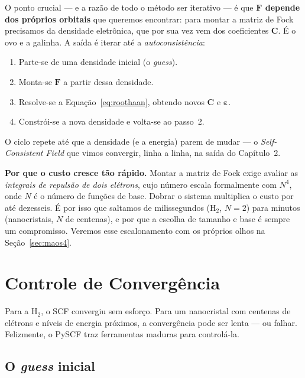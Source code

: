 \documentclass[11pt,a4paper,openany]{book}
\newcommand{\pyscf}{\textsf{PySCF}}
\begin{document}
O ponto crucial --- e a razão de todo o método ser iterativo --- é que
\textbf{$\mathbf{F}$ depende dos próprios orbitais} que queremos encontrar: para
montar a matriz de Fock precisamos da densidade eletrônica, que por sua vez vem
dos coeficientes $\mathbf{C}$. É o ovo e a galinha. A saída é iterar até a
\emph{autoconsistência}:

\begin{enumerate}[leftmargin=*]
  \item Parte-se de uma densidade inicial (o \emph{guess}).
  \item Monta-se $\mathbf{F}$ a partir dessa densidade.
  \item Resolve-se a Equação~\ref{eq:roothaan}, obtendo novos $\mathbf{C}$ e
        $\boldsymbol{\varepsilon}$.
  \item Constrói-se a nova densidade e volta-se ao passo~2.
\end{enumerate}

\noindent
O ciclo repete até que a densidade (e a energia) parem de mudar --- o
\emph{Self-Consistent Field} que vimos convergir, linha a linha, na saída do
Capítulo~2.

\begin{caixanota}
\textbf{Por que o custo cresce tão rápido.} Montar a matriz de Fock exige avaliar
as \emph{integrais de repulsão de dois elétrons}, cujo número escala formalmente
com $N^4$, onde $N$ é o número de funções de base. Dobrar o sistema multiplica o
custo por até dezesseis. É por isso que saltamos de milissegundos (H$_2$, $N=2$)
para minutos (nanocristais, $N$ de centenas), e por que a escolha de tamanho e
base é sempre um compromisso. Veremos esse escalonamento com os próprios olhos na
Seção~\ref{sec:maos4}.
\end{caixanota}

\section{Controle de Convergência}
\label{sec:convergencia}

Para a H$_2$, o SCF convergiu sem esforço. Para um nanocristal com centenas de
elétrons e níveis de energia próximos, a convergência pode ser lenta --- ou
falhar. Felizmente, o \pyscf{} traz ferramentas maduras para controlá-la.

\subsection{O \emph{guess} inicial}
\end{document}
